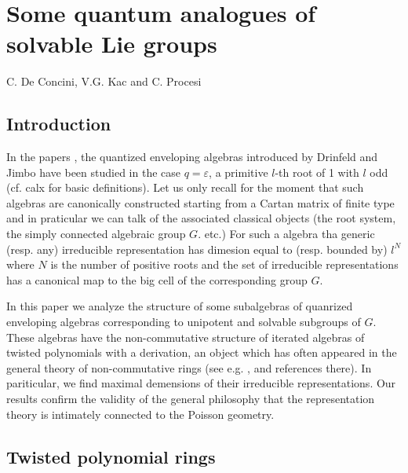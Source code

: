 \chapter{Some quantum analogues of solvable Lie groups}\label{chap4}


\begin{center}
C. De Concini, V.G. Kac and C. Procesi
\end{center}

\section*{Introduction}
\pageoriginale
In the papers \cite{chap4-keyDK1} \cite{chap4-keyDK2}, \cite{chap4-keyDKP1} \cite{chap4-keyDKP2}the quantized enveloping algebras introduced by Drinfeld and Jimbo have been studied in the case $q=\varepsilon$, a primitive $l$-th root of 1 with $l$ odd (cf. calx for basic definitions). Let us only recall for the moment that such algebras are canonically constructed starting from a Cartan matrix of finite type and in praticular we can talk of the associated classical objects (the root system, the simply connected algebraic group $G$. etc.) For such a algebra tha generic (resp. any) irreducible representation has dimesion equal to (resp. bounded by) $l^{N}$ where $N$ is the number of positive roots and the set of irreducible representations has a canonical map to the big cell of the corresponding group $G$.

In this paper we analyze the structure of some subalgebras of quanrized enveloping algebras corresponding to unipotent and solvable subgroups of $G$. These algebras have the non-commutative structure of iterated algebras of twisted polynomials with a derivation, an object which has often appeared in the general theory of non-commutative rings (see e.g. \cite{chap4-keyKP}, \cite{chap4-keyGL} and references there). In  pariticular, we find maximal demensions of their irreducible representations. Our results confirm the validity of the general philosophy that the representation theory is intimately connected to the Poisson geometry.

\section{Twisted polynomial rings}\label{chap4-sec1}

